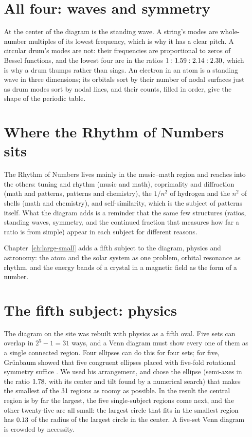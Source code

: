 \section{All four: waves and symmetry}

At the center of the diagram is the standing wave. A string's modes are whole-number multiples of its lowest frequency, which is why it has a clear pitch. A circular drum's modes are not: their frequencies are proportional to zeros of Bessel functions, and the lowest four are in the ratios $1 : 1.59 : 2.14 : 2.30$, which is why a drum thumps rather than sings. An electron in an atom is a standing wave in three dimensions; its orbitals sort by their number of nodal surfaces just as drum modes sort by nodal lines, and their counts, filled in order, give the shape of the periodic table.

\section{Where the Rhythm of Numbers sits}

The Rhythm of Numbers lives mainly in the music--math region and reaches into the others: tuning and rhythm (music and math), coprimality and diffraction (math and patterns, patterns and chemistry), the $1/n^2$ of hydrogen and the $n^2$ of shells (math and chemistry), and self-similarity, which is the subject of patterns itself. What the diagram adds is a reminder that the same few structures (ratios, standing waves, symmetry, and the continued fraction that measures how far a ratio is from simple) appear in each subject for different reasons.

Chapter~\ref{ch:large-small} adds a fifth subject to the diagram, physics and astronomy: the atom and the solar system as one problem, orbital resonance as rhythm, and the energy bands of a crystal in a magnetic field as the form of a number. \addedon{\revD}

\section{The fifth subject: physics}\label{sec:fifth}
\addednote{\revE}

The diagram on the site was rebuilt with physics as a fifth oval. Five sets can overlap in $2^5 - 1 = 31$ ways, and a Venn diagram must show every one of them as a single connected region. Four ellipses can do this for four sets; for five, Grünbaum showed that five congruent ellipses placed with five-fold rotational symmetry suffice \citep{Grunbaum1975}. We used his arrangement, and chose the ellipse (semi-axes in the ratio $1.78$, with its center and tilt found by a numerical search) that makes the smallest of the 31 regions as roomy as possible. In the result the central region is by far the largest, the five single-subject regions come next, and the other twenty-five are all small: the largest circle that fits in the smallest region has $0.13$ of the radius of the largest circle in the center. A five-set Venn diagram is crowded by necessity.

